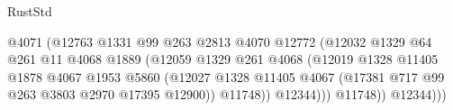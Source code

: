 \begin{lexlean}{RustStd}
\begin{coremodule}
                                                  @4071
                                                  (@12763
                                                    @1331
                                                    @99
                                                    @263
                                                    @2813
                                                    @4070
                                                    @12772
                                                    (@12032
                                                      @1329
                                                      @64
                                                      @261
                                                      @11
                                                      @4068
                                                      @1889
                                                      (@12059
                                                        @1329
                                                        @261
                                                        @4068
                                                        (@12019
                                                          @1328
                                                          @11405
                                                          @1878
                                                          @4067
                                                          @1953
                                                          @5860
                                                          (@12027
                                                            @1328
                                                            @11405
                                                            @4067
                                                            (@17381
                                                              @717
                                                              @99
                                                              @263
                                                              @3803
                                                              @2970
                                                              @17395
                                                              @12900))
                                                          @11748))
                                                      @12344)))
                                                @11748))
                                            @12344)))

\end{coremodule}
\end{lexlean}
